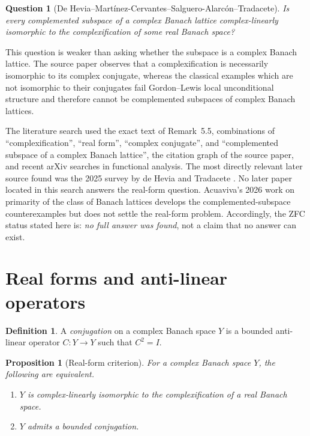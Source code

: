 \documentclass[11pt]{article}
\newtheorem{proposition}[theorem]{Proposition}
\newtheorem{question}[theorem]{Question}
\theoremstyle{definition}
\newtheorem{definition}[theorem]{Definition}
\theoremstyle{remark}
\begin{document}
\begin{question}[De Hevia--Mart\'inez-Cervantes--Salguero-Alarc\'on--Tradacete]
Is every complemented subspace of a complex Banach lattice complex-linearly isomorphic to the complexification of some real Banach space?
\end{question}

This question is weaker than asking whether the subspace is a complex Banach lattice. The source paper observes that a complexification is necessarily isomorphic to its complex conjugate, whereas the classical examples which are not isomorphic to their conjugates fail Gordon--Lewis local unconditional structure and therefore cannot be complemented subspaces of complex Banach lattices.

The literature search used the exact text of Remark~5.5, combinations of ``complexification'', ``real form'', ``complex conjugate'', and ``complemented subspace of a complex Banach lattice'', the citation graph of the source paper, and recent arXiv searches in functional analysis. The most directly relevant later source found was the 2025 survey by de Hevia and Tradacete \cite{deHeviaTradaceteSurvey}. No later paper located in this search answers the real-form question. Acuaviva's 2026 work on primarity of the class of Banach lattices develops the complemented-subspace counterexamples but does not settle the real-form problem. Accordingly, the ZFC status stated here is: \emph{no full answer was found}, not a claim that no answer can exist.

\section{Real forms and anti-linear operators}

\begin{definition}
A \emph{conjugation} on a complex Banach space $Y$ is a bounded anti-linear operator $C:Y\to Y$ such that $C^2=I$.
\end{definition}

\begin{proposition}[Real-form criterion]\label{prop:real-form-criterion}
For a complex Banach space $Y$, the following are equivalent.
\begin{enumerate}[label=(\roman*)]
\item $Y$ is complex-linearly isomorphic to the complexification of a real Banach space.
\item $Y$ admits a bounded conjugation.
\end{enumerate}
\end{proposition}
\end{document}
